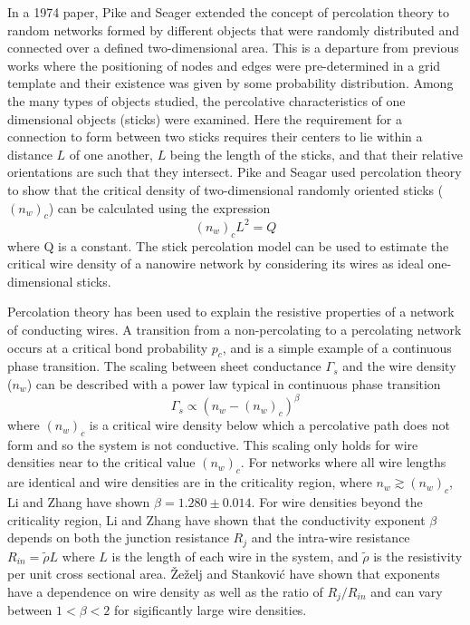 In a 1974 paper, Pike and Seager\cite{pike1974} extended the concept of percolation theory to random networks formed by different objects that were randomly distributed and connected over a defined two-dimensional area\cite{pike1974}. This is a departure from previous works where the positioning of nodes and edges were pre-determined in a grid template and their existence was given by some probability distribution. Among the many types of objects studied, the percolative characteristics of one dimensional objects (sticks) were examined\cite{pike1974}. Here the requirement for a connection to form between two sticks requires their centers to lie within a distance $L$ of one another, $L$ being the length of the sticks, and that their relative orientations are such that they intersect. Pike and Seagar used percolation theory to show that the critical density of two-dimensional randomly oriented sticks ($(n_w)_c$) can be calculated using the expression
\begin{equation}
(n_w)_c L^2 = Q
\label{eq: critical_density}
\end{equation}
where Q is a constant. The stick percolation model can be used to estimate the critical wire density of a nanowire network by considering its wires as ideal one-dimensional sticks. 

Percolation theory has been used to explain the resistive properties of a network of conducting wires\cite{balberg1983}. A transition from a non-percolating to a percolating network occurs at a critical bond probability $p_c$, and is a simple example of a continuous phase transition\cite{christensen2002}. The scaling between sheet conductance $\Gamma_s$ and the wire density ($n_w$) can be described with a power law typical in continuous phase transition\cite{balberg1983}
\begin{equation}
\Gamma_s \propto (n_w - (n_w)_c)^{\beta}
\end{equation}
where $(n_w)_c$ is a critical wire density below which a percolative path does not form and so the system is not conductive. This scaling only holds for wire densities near to the critical value $(n_w)_c$. For networks where all wire lengths are identical and wire densities are in the criticality region, where $n_w \gtrsim (n_w)_c$, Li and Zhang have shown $\beta = 1.280 \pm 0.014$. For wire densities beyond the criticality region, Li and Zhang have shown that the conductivity exponent $\beta$ depends on both the junction resistance $R_j$ and the intra-wire resistance $R_{in} = \tilde{\rho} L$ where $L$ is the length of each wire in the system, and $\tilde{\rho}$ is the resistivity per unit cross sectional area\cite{li2009}. \v{Z}e\v{z}elj and Stankovi\'c \cite{zezelj2012} have shown that exponents have a dependence on wire density as well as the ratio of $R_j/R_{in}$ and can vary between $1 < \beta <2$ for sigificantly large wire densities. 

